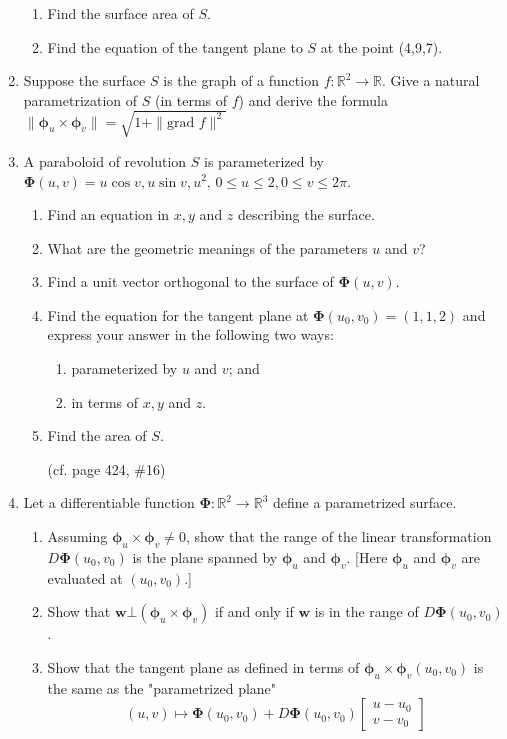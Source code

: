\documentclass{article}
\newcommand{\norm}[1]{\| #1 \|}
\begin{document}
\begin{enumerate}
    \begin{enumerate}
        \item Find the surface area of $S$.
        \item Find the equation of the tangent plane to $S$ at the point (4,9,7).
    \end{enumerate}
    \newpage    
    \item Suppose the surface $S$ is the graph of a function $f : \mathbb{R}^2 \rightarrow \mathbb{R}$. Give a natural parametrization of $S$ (in terms of $f$) and derive the formula $\norm{\boldsymbol \phi_u \times \boldsymbol \phi_v} = \sqrt{1 + \norm{\text{grad }f}^2}$
    \newpage
    \item A paraboloid of revolution $S$ is parameterized by $\boldsymbol \Phi (u,v) = u \cos v, u \sin v, u^2$, $0 \leq u \leq 2, 0 \leq v \leq 2\pi$.
    \begin{enumerate}
        \item Find an equation in $x,y$ and $z$ describing the surface.
        \item What are the geometric meanings of the parameters $u$ and $v$?
        \item Find a unit vector orthogonal to the surface of $\boldsymbol \Phi (u,v)$.
        \item Find the equation for the tangent plane at $\boldsymbol \Phi(u_0,v_0) = (1,1,2)$ and express your answer in the following two ways:
        \begin{enumerate}
            \item parameterized by $u$ and $v$; and
            \item in terms of $x,y$ and $z$.
        \end{enumerate}

        \item Find the area of $S$.

        (cf. page 424, \#16)
    \end{enumerate}
    \newpage
    \item Let a differentiable function $\boldsymbol \Phi : \mathbb{R}^2 \rightarrow \mathbb{R}^3$ define a parametrized surface.
    \begin{enumerate}
        \item Assuming $\boldsymbol \phi_u \times \boldsymbol \phi_v \not = 0$, show that the range of the linear transformation $D \boldsymbol \Phi(u_0,v_0)$ is the plane spanned by $\boldsymbol \phi_u$ and $\boldsymbol \phi_v$. [Here $\boldsymbol \phi_u$ and $\boldsymbol \phi_v$ are evaluated at $(u_0,v_0)$.]
        \item Show that $\boldsymbol w \bot (\boldsymbol \phi_u \times \boldsymbol \phi_v)$ if and only if $\boldsymbol w$ is in the range of $D\boldsymbol \Phi(u_0,v_0)$.
        \item Show that the tangent plane as defined in terms of $\boldsymbol \phi_u \times \boldsymbol \phi_v (u_0,v_0)$ is the same as the "parametrized plane"
        \[
        (u,v) \mapsto \boldsymbol \Phi(u_0,v_0) + D\boldsymbol \Phi(u_0,v_0) \begin{bmatrix} u- u_0 \\ v - v_0 \end{bmatrix}
        \]


\end{enumerate}
\end{enumerate}
\end{document}
